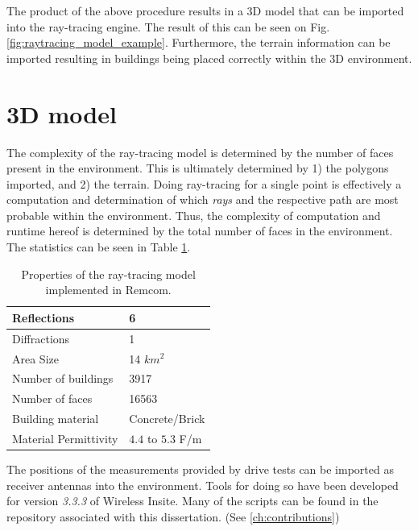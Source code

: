 The product of the above procedure results in a 3D model that can be imported into the ray-tracing engine. The result of this can be seen on Fig. \ref{fig:raytracing_model_example}. Furthermore, the terrain information can be imported resulting in buildings being placed correctly within the 3D environment.


\section{3D model}

The complexity of the ray-tracing model is determined by the number of faces present in the environment. This is ultimately determined by 1) the polygons imported, and 2) the terrain. Doing ray-tracing for a single point is effectively a computation and determination of which  \emph{rays} and the respective path are most probable within the environment. Thus, the complexity of computation and runtime hereof is determined by the total number of faces in the environment. The statistics can be seen in Table \ref{tab:ray_prop}.

\begin{table}[]
\begin{center}
\begin{tabular}{l|l}
Reflections         & 6  \\ \hline
Diffractions        & 1  \\ \hline
Area Size           & 14 $km^2$ \\ \hline
Number of buildings & 3917 \\ \hline
Number of faces     & 16563 \\ \hline
Building material   & Concrete/Brick  \\ \hline
Material Permittivity & $4.4$ to $5.3$ F/m \\ \hline
\end{tabular}
\end{center}
\caption{Properties of the ray-tracing model implemented in Remcom.}\label{tab:ray_prop}
\vspace{-1em}
\end{table}

The positions of the measurements provided by drive tests can be imported as receiver antennas into the environment. Tools for doing so have been developed for version \emph{3.3.3} of Wireless Insite. Many of the scripts can be found in the repository associated with this dissertation. (See \ref{ch:contributions})

